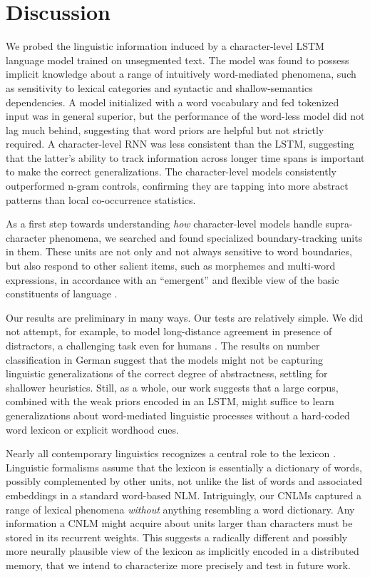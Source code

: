 \section{Discussion}
\label{sec:discussion}

We probed the linguistic information induced by a character-level LSTM
language model trained on unsegmented text. The model was found to
possess implicit knowledge about a range of intuitively word-mediated
phenomena, such as sensitivity to lexical categories and syntactic and
shallow-semantics dependencies. A model initialized with a word
vocabulary and fed tokenized input was in general superior, but the
performance of the word-less model did not lag much behind, suggesting
that word priors are helpful but not strictly required. A
character-level RNN was less consistent than the LSTM, suggesting that
the latter's ability to track information across longer time spans is
important to make the correct generalizations. The character-level
models consistently outperformed n-gram controls, confirming they are
tapping into more abstract patterns than local co-occurrence
statistics.

As a first step towards understanding \emph{how} character-level
models handle supra-character phenomena, we searched and found
specialized boundary-tracking units in them. These units are not only
and not always sensitive to word boundaries, but also respond to other
salient items, such as morphemes and multi-word expressions, in
accordance with an ``emergent'' and flexible view of the basic
constituents of language \cite{Schiering:etal:2010}.

Our results are preliminary in many ways. Our tests are relatively
simple. We did not attempt, for example, to model long-distance
agreement in presence of distractors, a challenging task even for
humans \citep{Gulordava:etal:2018}. The results on number
classification in German suggest that the models might not be
capturing linguistic generalizations of the correct degree of
abstractness, settling for shallower heuristics. Still, as a whole,
our work suggests that a large corpus, combined with the weak priors
encoded in an LSTM, might suffice to learn generalizations about
word-mediated linguistic processes without a hard-coded word lexicon
or explicit wordhood cues.

Nearly all contemporary linguistics recognizes a central role to the
lexicon \cite[see, e.g.,][for very different
perspectives]{Sag:etal:2003,Goldberg:2005,Radford:2006,Bresnan:etal:2016,Jezek:2016}. Linguistic
formalisms assume that the lexicon is essentially a dictionary of
words, possibly complemented by other units, not unlike the list of
words and associated embeddings in a standard word-based
NLM. Intriguingly, our CNLMs captured a range of lexical phenomena
\emph{without} anything resembling a word dictionary. Any information
a CNLM might acquire about units larger than characters must be stored
in its recurrent weights. This suggests a radically different and
possibly more neurally plausible view of the lexicon as
implicitly encoded in a distributed memory, that we intend to
characterize more precisely and test in future work.

